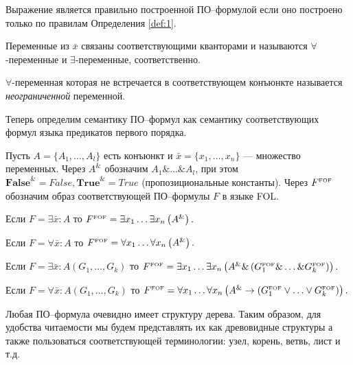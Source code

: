 Выражение является правильно построенной ПО--формулой если оно построено только по правилам Определения \ref{def:1}.

Переменные из $\bar{x}$ связаны соответствующими кванторами и называются $\forall$-переменные и $\exists$-переменные, соответственно.

$\forall$-переменная которая не встречается в соответствующем конъюнкте называется {\em неограниченной} переменной.

Теперь определим семантику ПО--формул как семантику соответствующих формул языка предикатов первого порядка.

\begin{definition}\label{def:semantic}
Пусть $A = \{A_1,\ldots,A_l\}$ есть конъюнкт и $\bar{x} = \{x_1,\ldots,x_n\}$ --- множество переменных. Через $A^{\&}$ обозначим $A_1 \&\ldots\&A_l$, при этом $\boldsymbol{False}^{\&}= False, \boldsymbol{True}^{\&}=True$ (пропозициональные константы). Через $F^{\text{\tiny{FOF}}}$ обозначим образ соответствующей ПО--формулы $F$ в языке FOL.

Если $F= \exists \bar{x}\colon A$ то $F^{\text{\tiny{FOF}}} = \exists x_1 \ldots \exists x_n \left(A^{\&}\right).$

Если $F = \forall \bar{x}\colon A$ то $F^{\text{\tiny{FOF}}} = \forall x_1 \ldots \forall x_n \left(A^{\&}\right).$

Если $F = \exists \bar{x}\colon A\left(G_1,\ldots,G_k\right)$ то $F^{\text{\tiny{FOF}}} = \exists x_1 \ldots \exists x_n  \left(A^{\&} \& \left(G_{1}^{\text{\tiny{FOF}}} \& \ldots \& G_{k}^{\text{\tiny{FOF}}}\right)\right).$

Если $F = \forall \bar{x}\colon A\left(G_1,\ldots,G_k\right)$ то $F^{\text{\tiny{FOF}}} = \forall x_1 \ldots \forall x_n \left(A^{\&}\rightarrow \left(G_{1}^{\text{\tiny{FOF}}} \vee\ldots\vee G_{k}^{\text{\tiny{FOF}}}\right)\right).$

\end{definition}

Любая ПО--формула очевидно имеет структуру дерева. Таким образом, для удобства читаемости мы будем представлять их как древовидные структуры а также пользоваться соответствующей терминологии: узел, корень, ветвь, лист и т.д.

